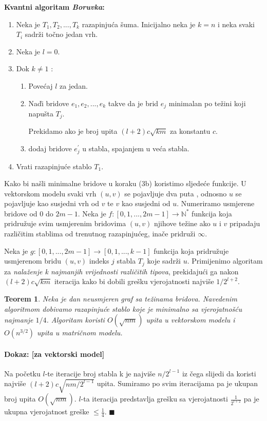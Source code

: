 \documentclass[a4paper,12pt]{article}
\newtheorem{tm}{Teorem}
\begin{document}
\textbf{Kvantni algoritam \emph{Boruvka}:}
\begin{enumerate}
	\item Neka je $T_1,T_2, ..., T_k$ razapinju\'ca \v{s}uma. Inicijalno neka je  $k=n$ i neka svaki $T_i$ sadr\v{z}i to\v{c}no jedan vrh.
	\item Neka je $l=0$.
	\item Dok $k\ne 1$ :
	\begin{enumerate}
		\item Pove\'caj $l$ za jedan.
		\item Na\v{d}i bridove $e_1, e_2, ..., e_k$ takve da je brid $e_j$ minimalan po te\v{z}ini koji napu\v{s}ta $T_j$.
		
		Prekidamo ako je broj upita $(l+2)c\sqrt{km}$ za konstantu $c$.
		\item dodaj bridove $e_j^{'}$ u stabla, spajanjem u ve\'ca stabla.
	\end{enumerate}
	\item Vrati razapinju\'ce stablo $T_1$.
\end{enumerate}
Kako bi na\v{s}li minimalne bridove u koraku (3b) koristimo sljede\'ce funkcije. 
U vektorskom modelu svaki vrh $(u,v)$ se pojavljuje dva puta , odnosno $u$ se pojavljuje kao susjedni vrh od $v$ te $v$ kao susjedni od $u$. Numeriramo usmjerene bridove od $0$ do $2m-1$. 
Neka je $f: [0, 1, ..., 2m-1] \rightarrow \mathbb{N} ^{*}$ funkcija koja pridru\v{z}uje svim usmjerenim bridovima $(u,v)$ njihove te\v{z}ine ako $u$ i $v$ pripadaju razli\v{c}itim stablima od trenutnog razapinju\'ceg, ina\v{c}e pridru\v{z}i $ \infty$.

Neka je $g: [0, 1, ..., 2m-1] \rightarrow [0, 1, ..., k-1]$ funkcija koja pridru\v{z}uje usmjerenom bridu $(u,v)$ indeks $j$ stabla $T_j$ koje sadr\v{z}i $u$. Primijenimo algoritam za \emph{nala\v{z}enje k najmanjih vrijednosti razli\v{c}itih tipova}, prekidaju\'ci ga nakon $(l+2)c\sqrt{km}$ iteracija kako bi dobili gre\v{s}ku vjerojatnosti najvi\v{s}e $1/2^{l+2}$.

\begin{tm}
Neka je dan neusmjeren graf sa te\v{z}inama bridova. Navedenim algoritmom dobivamo razapinju\'ce stablo koje je minimalno sa vjerojatno\v{s}\'cu najmanje $1/4$. Algoritam koristi $O(\sqrt{nm})$ upita u vektorskom modelu i $O(n^{3/2})$ upita u matri\v{c}nom modelu.
\end{tm}

\paragraph{Dokaz: [za vektorski model]}
Na po\v{c}etku $l$-te iteracije broj stabla k je najvi\v{s}e $n/2^{l-1}$ iz \v{c}ega slijedi da koristi najvi\v{s}e $(l+2)c\sqrt{nm/2^{l-1}}$ upita. Sumiramo po svim iteracijama pa je ukupan broj upita $O(\sqrt{nm})$.
$l$-ta iteracija predstavlja gre\v{s}ku sa vjerojatnosti $\frac{1}{2^{l+2}}$ pa je ukupna vjerojatnost gre\v{s}ke $ \leq \frac{1}{4}$.
$\blacksquare$ 
\end{document}
